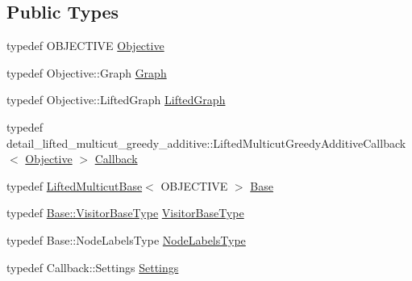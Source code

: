 \subsection*{Public Types}
\begin{DoxyCompactItemize}
\item 
typedef O\+B\+J\+E\+C\+T\+I\+V\+E \hyperlink{classnifty_1_1graph_1_1lifted__multicut_1_1LiftedMulticutGreedyAdditive_a964a91c5c0a4a6e7e08c2b321f0b6768}{Objective}
\item 
typedef Objective\+::\+Graph \hyperlink{classnifty_1_1graph_1_1lifted__multicut_1_1LiftedMulticutGreedyAdditive_abb83ade2fb95c974b3648e411532c872}{Graph}
\item 
typedef Objective\+::\+Lifted\+Graph \hyperlink{classnifty_1_1graph_1_1lifted__multicut_1_1LiftedMulticutGreedyAdditive_a5e61ec608c41b4768cf339e966e8fb7f}{Lifted\+Graph}
\item 
typedef detail\+\_\+lifted\+\_\+multicut\+\_\+greedy\+\_\+additive\+::\+Lifted\+Multicut\+Greedy\+Additive\+Callback$<$ \hyperlink{classnifty_1_1graph_1_1lifted__multicut_1_1LiftedMulticutGreedyAdditive_a964a91c5c0a4a6e7e08c2b321f0b6768}{Objective} $>$ \hyperlink{classnifty_1_1graph_1_1lifted__multicut_1_1LiftedMulticutGreedyAdditive_a0f298ccab4ca174bb91fd3026b473b5f}{Callback}
\item 
typedef \hyperlink{classnifty_1_1graph_1_1lifted__multicut_1_1LiftedMulticutBase}{Lifted\+Multicut\+Base}$<$ O\+B\+J\+E\+C\+T\+I\+V\+E $>$ \hyperlink{classnifty_1_1graph_1_1lifted__multicut_1_1LiftedMulticutGreedyAdditive_ad7da40c743c9fa684412df069ce30440}{Base}
\item 
typedef \hyperlink{classnifty_1_1graph_1_1optimization_1_1common_1_1SolverBase_a5a14d64c70a9cc0eebc7d71d2b089f9b}{Base\+::\+Visitor\+Base\+Type} \hyperlink{classnifty_1_1graph_1_1lifted__multicut_1_1LiftedMulticutGreedyAdditive_a3f18c0e6365fda786426a7ea03bc5847}{Visitor\+Base\+Type}
\item 
typedef Base\+::\+Node\+Labels\+Type \hyperlink{classnifty_1_1graph_1_1lifted__multicut_1_1LiftedMulticutGreedyAdditive_aeb295097f2ca8a7f9cf0770df94c17ab}{Node\+Labels\+Type}
\item 
typedef Callback\+::\+Settings \hyperlink{classnifty_1_1graph_1_1lifted__multicut_1_1LiftedMulticutGreedyAdditive_aaec19034ff79fb4ca939a44bf0b30bf3}{Settings}
\end{DoxyCompactItemize}
